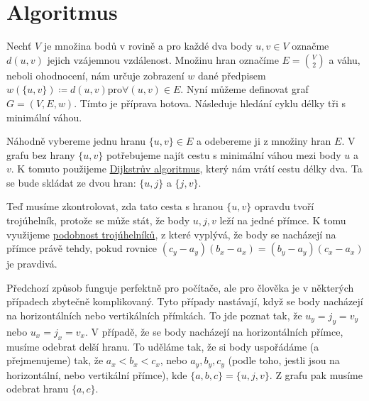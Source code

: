 \section{Algoritmus}
\label{sec:algoritmus}

Nechť $V$ je množina bodů v rovině a pro každé dva body $u, v \in V$ označme $d(u, v)$ jejich vzájemnou vzdálenost. Množinu hran označíme $E = \binom{V}{2}$ a váhu, neboli ohodnocení, nám určuje zobrazení $w$ dané předpisem $w(\{u, v\}) \coloneqq d(u, v) $pro$ \forall (u, v) \in E$. Nyní můžeme definovat graf $G = (V, E, w)$.
Tímto je příprava hotova. Následuje hledání cyklu délky tři s minimální váhou.



Náhodně vybereme jednu hranu $\{u, v\} \in E$ a odebereme ji z množiny hran $E$. V grafu bez hrany $\{u, v\}$ potřebujeme najít cestu s minimální váhou mezi body $u$ a  $v$. K tomuto použijeme \hyperref[sec:dijkstra]{Dijkstrův algoritmus}, který nám vrátí cestu délky dva. Ta se bude skládat ze dvou hran: $\{u, j\}$ a $\{j, v\}$.

Teď musíme zkontrolovat, zda tato cesta s hranou $\{u, v\}$ opravdu tvoří trojúhelník, protože se může  stát, že body $u, j, v$ leží na jedné přímce. K tomu využijeme \hyperref[sec:podobnost]{podobnost trojúhelníků}, z které vyplývá, že body se nacházejí na přímce právě tehdy, pokud rovnice $(c_y - a_y)(b_x - a_x) = (b_y - a_y)(c_x - a_x)$ je pravdivá. 

\begin{poznamka}
Předchozí způsob funguje perfektně pro počítače, ale pro člověka je v některých případech zbytečně komplikovaný. Tyto případy nastávají, když se body nacházejí na horizontálních nebo vertikálních přímkách. To jde poznat tak, že $u_y = j_y = v_y$ nebo $u_x = j_x = v_x$.
V případě, že se body nacházejí na horizontálních přímce, musíme odebrat delší hranu. To uděláme tak, že si body uspořádáme (a přejmenujeme) tak, že $a_x<b_x<c_x$, nebo $a_y, b_y, c_y$ (podle toho, jestli jsou na horizontální, nebo vertikální přímce), kde $\{a, b, c\} = \{u, j, v\}$. Z grafu pak musíme odebrat hranu $\{a, c\}$.
\end{poznamka}



